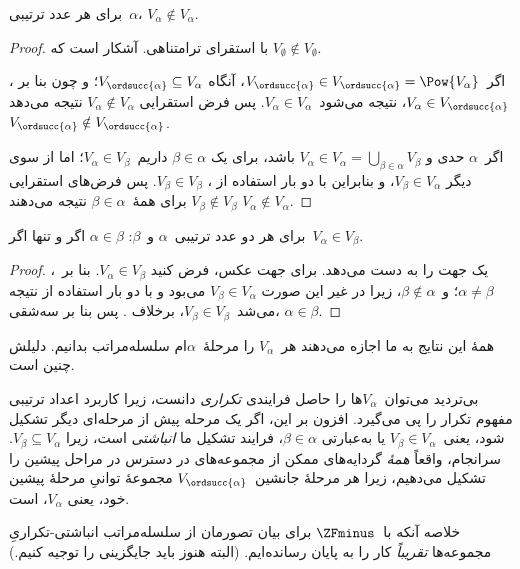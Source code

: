 \documentclass[../../../include/open-logic-section]{subfiles}
\begin{document}
\begin{lem}
برای هر عدد ترتیبی~$\alpha$، $V_\alpha\notin V_\alpha$.
\end{lem}

\begin{proof}
با استقرای ترامتناهی. آشکار است که
$V_\emptyset\notin V_\emptyset$.

اگر~$V_{\ordsucc{\alpha}}\in V_{\ordsucc{\alpha}}=
\Pow{V_\alpha}$، آنگاه
$V_{\ordsucc{\alpha}}\subseteq V_\alpha$؛ و چون بنا بر
، $V_\alpha\in V_{\ordsucc{\alpha}}$، نتیجه
می‌شود~$V_\alpha\in V_\alpha$. پس فرض استقرایی
$V_\alpha\notin V_\alpha$ نتیجه می‌دهد
$V_{\ordsucc{\alpha}}\notin V_{\ordsucc{\alpha}}$.

اگر~$\alpha$ حدی و
$V_\alpha\in V_\alpha=\bigcup_{\beta\in\alpha}V_\beta$ باشد، برای یک
$\beta\in\alpha$ داریم~$V_\alpha\in V_\beta$؛ اما از سوی دیگر
$V_\beta\in V_\alpha$، و بنابراین با دو بار استفاده از
، $V_\beta\in V_\beta$. پس فرض‌های استقرایی
$V_\beta\notin V_\beta$ برای همهٔ~$\beta\in\alpha$ نتیجه می‌دهند
$V_\alpha\notin V_\alpha$.
\end{proof}

\begin{cor}
برای هر دو عدد ترتیبی~$\alpha$ و~$\beta$:
$\alpha\in\beta$ اگر و تنها اگر~$V_\alpha\in V_\beta$.
\end{cor}

\begin{proof}
 یک جهت را به دست می‌دهد. برای جهت عکس، فرض کنید
$V_\alpha\in V_\beta$. بنا بر~،
$\alpha\neq\beta$؛ و~$\beta\notin\alpha$، زیرا در غیر این صورت
$V_\beta\in V_\alpha$ می‌بود و با دو بار استفاده از
 نتیجه می‌شد~$V_\beta\in V_\beta$، برخلاف
. پس بنا بر سه‌شقی، $\alpha\in\beta$.
\end{proof}
\noindent
همهٔ این نتایج به ما اجازه می‌دهند هر~$V_\alpha$ را مرحلهٔ~$\alpha$ام
سلسله‌مراتب بدانیم. دلیلش چنین است.

بی‌تردید می‌توان~$V_\alpha$ها را حاصل فرایندی \emph{تکراری} دانست، زیرا
کاربرد اعداد ترتیبی مفهوم تکرار را پی می‌گیرد. افزون بر این، اگر یک مرحله
پیش از مرحله‌ای دیگر تشکیل شود، یعنی~$V_\beta\in V_\alpha$ یا به‌عبارتی
$\beta\in\alpha$، فرایند تشکیل ما \emph{انباشتی} است، زیرا
$V_\beta\subseteq V_\alpha$. سرانجام، واقعاً \emph{همهٔ} گردایه‌های ممکن
از مجموعه‌های در دسترس در مراحل پیشین را تشکیل می‌دهیم، زیرا هر مرحلهٔ
جانشین~$V_{\ordsucc{\alpha}}$ مجموعهٔ توانیِ مرحلهٔ پیشین خود، یعنی
$V_\alpha$، است.

خلاصه آنکه با~$\ZFminus$ برای بیان تصورمان از سلسله‌مراتب
انباشتی-تکراریِ مجموعه‌ها \emph{تقریباً} کار را به پایان رسانده‌ایم.
(البته هنوز باید جایگزینی را توجیه کنیم.)
\end{document}
